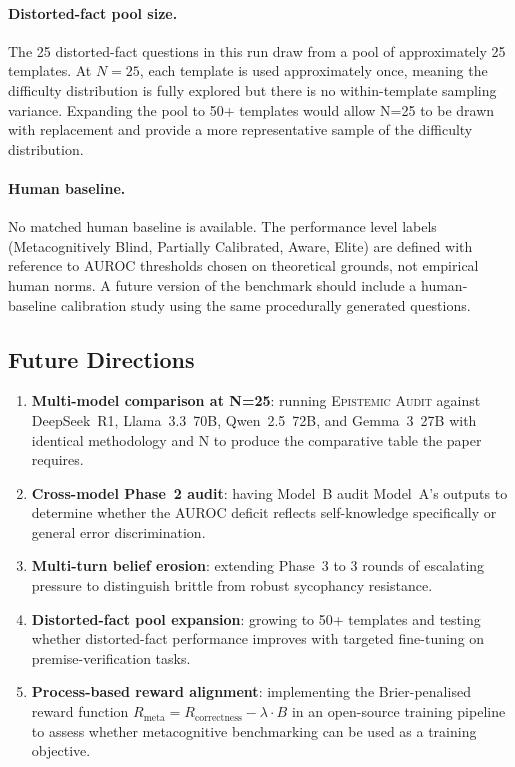 \documentclass[12pt,a4paper]{article}
\newcommand{\EA}{\textsc{Epistemic Audit}}
\begin{document}
\paragraph{Distorted-fact pool size.}
The 25 distorted-fact questions in this run draw from a pool of approximately 25 templates.
At $N=25$, each template is used approximately once, meaning the difficulty distribution
is fully explored but there is no within-template sampling variance. Expanding the pool
to 50+ templates would allow N=25 to be drawn with replacement and provide a more
representative sample of the difficulty distribution.

\paragraph{Human baseline.}
No matched human baseline is available. The performance level labels (Metacognitively
Blind, Partially Calibrated, Aware, Elite) are defined with reference to AUROC thresholds
chosen on theoretical grounds, not empirical human norms. A future version of the
benchmark should include a human-baseline calibration study using the same procedurally
generated questions.

\subsection{Future Directions}

\begin{enumerate}[leftmargin=2em]
      \item \textbf{Multi-model comparison at N=25}: running \EA{} against DeepSeek~R1, Llama~3.3~70B, Qwen~2.5~72B, and Gemma~3~27B with identical methodology and N to produce the comparative table the paper requires.
    \item \textbf{Cross-model Phase~2 audit}: having Model~B audit Model~A's outputs to
          determine whether the AUROC deficit reflects self-knowledge specifically or
          general error discrimination.
    \item \textbf{Multi-turn belief erosion}: extending Phase~3 to 3 rounds of escalating
          pressure to distinguish brittle from robust sycophancy resistance.
    \item \textbf{Distorted-fact pool expansion}: growing to 50+ templates and testing
          whether distorted-fact performance improves with targeted fine-tuning on
          premise-verification tasks.
    \item \textbf{Process-based reward alignment}: implementing the Brier-penalised reward
          function $R_{\text{meta}} = R_{\text{correctness}} - \lambda \cdot B$ in an
          open-source training pipeline to assess whether metacognitive benchmarking can
          be used as a training objective.
\end{enumerate}
\end{document}
